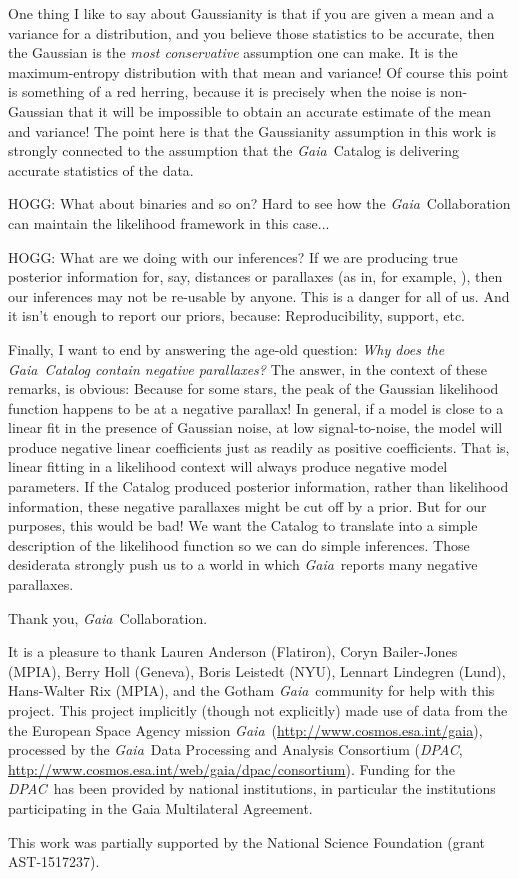 \documentclass[12pt, modern]{aastex62h}
\newcommand{\acronym}[1]{{\small{#1}}}
\newcommand{\Gaia}{\textsl{Gaia}}
\newcommand{\DPAC}{\textsl{\acronym{DPAC}}}
\begin{document}
One thing I like to say about Gaussianity is that if you are given a mean
and a variance for a distribution, and you believe those statistics to be
accurate, then the Gaussian is the \emph{most conservative} assumption one
can make.
It is the maximum-entropy distribution with that mean and variance!
Of course this point is something of a red herring, because it is precisely
when the noise is non-Gaussian that it will be impossible to obtain an
accurate estimate of the mean and variance!
The point here is that the Gaussianity assumption in this work is strongly connected
to the assumption that the \Gaia\ Catalog is delivering accurate statistics of
the data.

HOGG: What about binaries and so on? Hard to see how the \Gaia\ Collaboration can
maintain the likelihood framework in this case...

HOGG: What are we doing with our inferences? If we are producing true posterior
information for, say, distances or parallaxes (as in, for example,
\citealt{tri3, leistedt, anderson}), then our inferences may not
be re-usable by anyone. This is a danger for all of us. And it isn't enough
to report our priors, because: Reproducibility, support, etc.

Finally, I want to end by answering the age-old question:
\emph{Why does the \Gaia\ Catalog contain negative parallaxes?}
The answer, in the context of these remarks, is obvious:
Because for some stars, the peak of the Gaussian likelihood function happens
to be at a negative parallax!
In general, if a model is close to a linear fit in the presence of Gaussian
noise,
at low signal-to-noise, the model will produce negative linear coefficients just as
readily as positive coefficients.
That is, linear fitting in a likelihood context will always produce negative
model parameters.
If the Catalog produced posterior information, rather than likelihood information,
these negative parallaxes might be cut off by a prior.
But for our purposes, this would be bad!
We want the Catalog to translate into a simple description
of the likelihood function so we can do simple inferences.
Those desiderata strongly push us to a world in which \Gaia\ reports many
negative parallaxes.

Thank you, \Gaia\ Collaboration.

\acknowledgements
It is a pleasure to thank
  Lauren Anderson (Flatiron),
  Coryn Bailer-Jones (MPIA),
  Berry Holl (Geneva),
  Boris Leistedt (NYU),
  Lennart Lindegren (Lund),
  Hans-Walter Rix (MPIA),
and the Gotham \Gaia\ community for help with this project.
This project implicitly (though not explicitly) made use of data from the
the European Space Agency
mission \Gaia\ (\url{http://www.cosmos.esa.int/gaia}), processed by the
\Gaia\ Data Processing and Analysis Consortium (\DPAC,
\url{http://www.cosmos.esa.int/web/gaia/dpac/consortium}). Funding for the
\DPAC\ has been provided by national institutions, in particular the
institutions participating in the Gaia Multilateral Agreement.

This work was partially supported by
  the National Science Foundation (grant \acronym{AST-1517237}).


\end{document}
